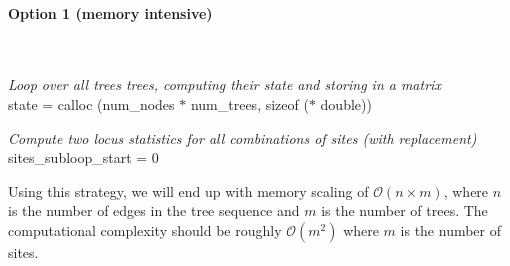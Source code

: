 \documentclass[12pt]{article}
\begin{document}
\paragraph{Option 1 (memory intensive)}
\mbox{} \\
\begin{algorithm}[H]

  \emph{Loop over all trees trees, computing their state and storing in a matrix} \\
  state = calloc (num\_nodes $\ast$ num\_trees, sizeof ($\ast$ double))
  
  \emph{Compute two locus statistics for all combinations of sites (with
replacement)} \\
  sites\_subloop\_start = 0

\end{algorithm}

Using this strategy, we will end up with memory scaling of $\mathcal{O}(n \times
m)$, where $n$ is the number of edges in the tree sequence and $m$ is the number
of trees. The computational complexity should be roughly $\mathcal{O}({m}^{2})$
where $m$ is the number of sites.
\end{document}
